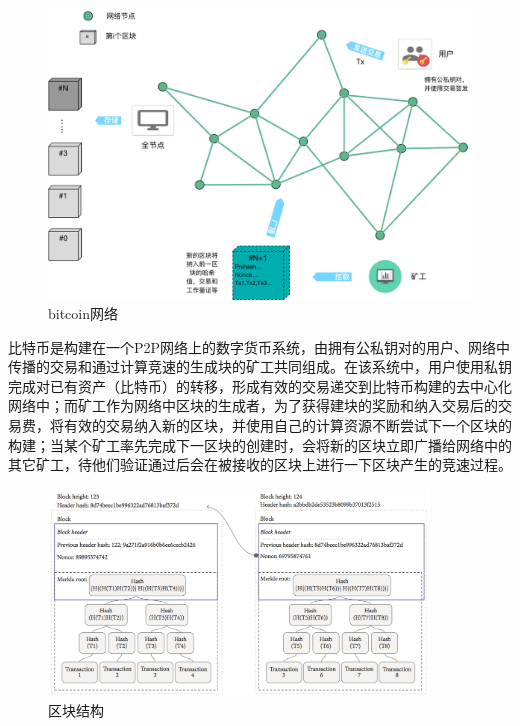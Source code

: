 \begin{figure}[htbp]
 	\centering
 	\includegraphics[width = 1\textwidth]{img/bitcoin_network}
 	\caption{bitcoin网络}\label{fig:bitcoin_network}
\end{figure}

比特币是构建在一个P2P网络上的数字货币系统，由拥有公私钥对的用户、网络中传播的交易和通过计算竞速的生成块的矿工共同组成。在该系统中，用户使用私钥完成对已有资产（比特币）的转移，形成有效的交易递交到比特币构建的去中心化网络中；而矿工作为网络中区块的生成者，为了获得建块的奖励和纳入交易后的交易费，将有效的交易纳入新的区块，并使用自己的计算资源不断尝试下一个区块的构建；当某个矿工率先完成下一区块的创建时，会将新的区块立即广播给网络中的其它矿工，待他们验证通过后会在被接收的区块上进行一下区块产生的竞速过程。




\begin{figure}[!htbp]
 	\centering
 	\includegraphics[width = 0.9\textwidth]{img/block_structure}
 	\caption{区块结构\cite{jesus2018survey}}\label{fig:block_structure}
\end{figure}

